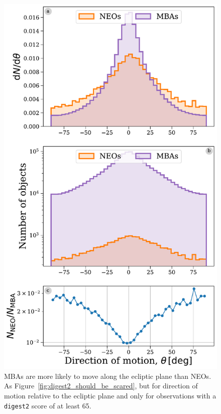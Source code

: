 \documentclass[twocolumn]{aastex631}
\newcommand{\dig}{\texttt{digest2}}
\begin{document}
\begin{figure}[htb]
    \centering
    \includegraphics[width=\columnwidth]{figures/direction_dist_highscore.pdf}
    \caption{MBAs are more likely to move along the ecliptic plane than NEOs. As Figure~\ref{fig:digest2_should_be_scared}, but for direction of motion relative to the ecliptic plane and only for observations with a \dig{} score of at least 65.}
    \label{fig:dir_highscore}
\end{figure}
\end{document}
